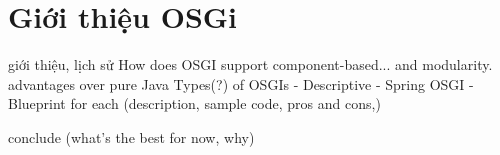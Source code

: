 \chapter{Giới thiệu OSGi}
 giới thiệu, lịch sử
 How does OSGI support component-based... and modularity.
advantages over pure Java
 Types(?) of OSGIs
- Descriptive
- Spring OSGI
- Blueprint
for each (description, sample code, pros and cons,)

conclude (what's the best for now, why)

